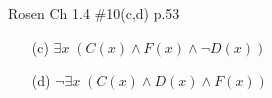 \documentclass[12pt,addpoints]{exam}
\begin{document}
\begin{questions}
\question Rosen Ch 1.4 \#10(c,d) p.53
    \begin{solution}
    \begin{itemize}
        \item[(c)] $\exists x\; (C(x) \wedge F(x) \wedge \neg D(x))$
        \item[(d)] $\neg \exists x\; (C(x) \wedge D(x) \wedge F(x))$
    \end{itemize}
    \end{solution}
    

\end{questions}
\end{document}

